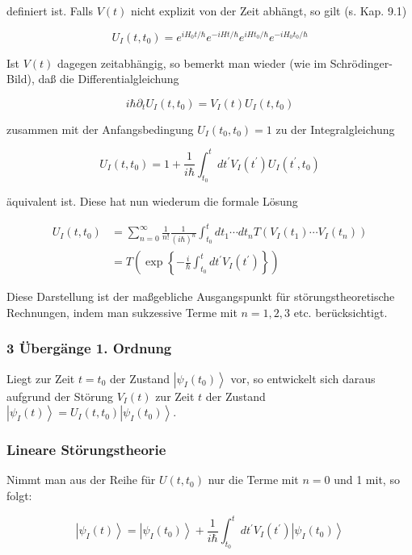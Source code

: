 \documentclass[10pt, letterpaper]{article}
\begin{document}
definiert ist. Falls $V(t)$ nicht explizit von der Zeit abhängt, so gilt (s. Kap. 9.1)

$$
U_{I}\left(t, t_{0}\right)=e^{i H_{0} t / \hbar} e^{-i H t / \hbar} e^{i H t_{0} / \hbar} e^{-i H_{0} t_{0} / \hbar}
$$

Ist $V(t)$ dagegen zeitabhängig, so bemerkt man wieder (wie im Schrödinger-Bild), daß die Differentialgleichung

$$
i \hbar \partial_{t} U_{I}\left(t, t_{0}\right)=V_{I}(t) U_{I}\left(t, t_{0}\right)
$$

zusammen mit der Anfangsbedingung $U_{I}\left(t_{0}, t_{0}\right)=1$ zu der Integralgleichung

$$
U_{I}\left(t, t_{0}\right)=1+\frac{1}{i \hbar} \int_{t_{0}}^{t} d t^{\prime} V_{I}\left(t^{\prime}\right) U_{I}\left(t^{\prime}, t_{0}\right)
$$

äquivalent ist. Diese hat nun wiederum die formale Lösung

$$
\begin{aligned}
U_{I}\left(t, t_{0}\right) & =\sum_{n=0}^{\infty} \frac{1}{n!} \frac{1}{(i \hbar)^{n}} \int_{t_{0}}^{t} d t_{1} \cdots d t_{n} T\left(V_{I}\left(t_{1}\right) \cdots V_{I}\left(t_{n}\right)\right) \\
& =T\left(\exp \left\{-\frac{i}{\hbar} \int_{t_{0}}^{t} d t^{\prime} V_{I}\left(t^{\prime}\right)\right\}\right)
\end{aligned}
$$

Diese Darstellung ist der maßgebliche Ausgangspunkt für störungstheoretische Rechnungen, indem man sukzessive Terme mit $n=1,2,3$ etc. berücksichtigt.

\subsubsection*{3 Übergänge 1. Ordnung}
Liegt zur Zeit $t=t_{0}$ der Zustand $\left|\psi_{I}\left(t_{0}\right)\right\rangle$ vor, so entwickelt sich daraus aufgrund der Störung $V_{I}(t)$ zur Zeit $t$ der Zustand $\left|\psi_{I}(t)\right\rangle=U_{I}\left(t, t_{0}\right)\left|\psi_{I}\left(t_{0}\right)\right\rangle$.

\subsubsection*{Lineare Störungstheorie}
Nimmt man aus der Reihe für $U\left(t, t_{0}\right)$ nur die Terme mit $n=0$ und 1 mit, so folgt:

$$
\left|\psi_{I}(t)\right\rangle=\left|\psi_{I}\left(t_{0}\right)\right\rangle+\frac{1}{i \hbar} \int_{t_{0}}^{t} d t^{\prime} V_{I}\left(t^{\prime}\right)\left|\psi_{I}\left(t_{0}\right)\right\rangle
$$
\end{document}
